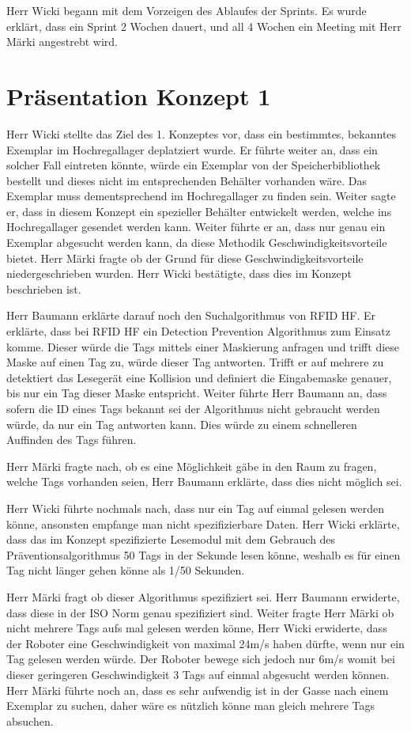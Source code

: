 \documentclass[parskip=full, a4paper]{scrreprt}
\begin{document}
Herr Wicki begann mit dem Vorzeigen des Ablaufes der Sprints.
Es wurde erklärt, dass ein Sprint 2 Wochen dauert, und all 4 Wochen ein Meeting mit Herr Märki angestrebt wird.

\chapter{Präsentation Konzept 1}

Herr Wicki stellte das Ziel des 1. Konzeptes vor, dass ein bestimmtes, bekanntes Exemplar im Hochregallager deplatziert wurde. Er führte weiter an, dass ein solcher Fall eintreten könnte, würde ein Exemplar von der Speicherbibliothek bestellt und dieses nicht im entsprechenden Behälter vorhanden wäre. Das Exemplar muss dementsprechend im Hochregallager zu finden sein.
Weiter sagte er, dass in diesem Konzept ein spezieller Behälter entwickelt werden, welche ins Hochregallager gesendet werden kann. Weiter führte er an, dass nur genau ein Exemplar abgesucht werden kann, da diese Methodik Geschwindigkeitsvorteile bietet. Herr Märki fragte ob der Grund für diese Geschwindigkeitsvorteile niedergeschrieben wurden. Herr Wicki bestätigte, dass dies im Konzept beschrieben ist.

Herr Baumann erklärte darauf noch den Suchalgorithmus von RFID HF. Er erklärte, dass bei RFID HF ein Detection Prevention Algorithmus zum Einsatz komme. Dieser würde die Tags mittels einer Maskierung anfragen und trifft diese Maske auf einen Tag zu, würde dieser Tag antworten. Trifft er auf mehrere zu detektiert das Lesegerät eine Kollision und definiert die Eingabemaske genauer, bis nur ein Tag dieser Maske entspricht. Weiter führte Herr Baumann an, dass sofern die ID eines Tags bekannt sei der Algorithmus nicht gebraucht werden würde, da nur ein Tag antworten kann. Dies würde zu einem schnelleren Auffinden des Tags führen.

Herr Märki fragte nach, ob es eine Möglichkeit gäbe in den Raum zu fragen, welche Tags vorhanden seien, Herr Baumann erklärte, dass dies nicht möglich sei.

Herr Wicki führte nochmals nach, dass nur ein Tag auf einmal gelesen werden könne, ansonsten empfange man nicht spezifizierbare Daten.
Herr Wicki erklärte, dass das im Konzept spezifizierte Lesemodul mit dem Gebrauch des Präventionsalgorithmus 50 Tags in der Sekunde lesen könne, weshalb es für einen Tag nicht länger gehen könne als 1/50 Sekunden.

Herr Märki fragt ob dieser Algorithmus spezifiziert sei. Herr Baumann erwiderte, dass diese in der ISO Norm genau spezifiziert sind.
Weiter fragte Herr Märki ob nicht mehrere Tags aufs mal gelesen werden könne, Herr Wicki erwiderte, dass der Roboter eine Geschwindigkeit von maximal 24m/s haben dürfte, wenn nur ein Tag gelesen werden würde. Der Roboter bewege sich jedoch nur 6m/s womit bei dieser geringeren Geschwindigkeit 3 Tags auf einmal abgesucht werden können.
Herr Märki führte noch an, dass es sehr aufwendig ist in der Gasse nach einem Exemplar zu suchen, daher wäre es nützlich könne man gleich mehrere Tags absuchen.
\end{document}
